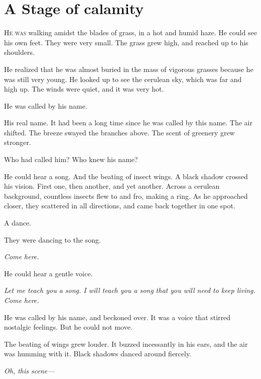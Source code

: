 
\chapter{A Stage of calamity}


\lettrine{H}{e was} walking amidst the blades of grass, in a hot and humid haze. He
could see his own feet. They were very small. The grass grew high, and
reached up to his shoulders.

He realized that he was almost buried in the mass of vigorous grasses
because he was still very young. He looked up to see the cerulean sky,
which was far and high up. The winds were quiet, and it was very hot.

He was called by his name.

His real name. It had been a long time since he was called by this name.
The air shifted. The breeze swayed the branches above. The scent of
greenery grew stronger.

Who had called him? Who knew his name?

He could hear a song. And the beating of insect wings. A black shadow
crossed his vision. First one, then another, and yet another. Across a
cerulean background, countless insects flew to and fro, making a ring.
As he approached closer, they scattered in all directions, and came back
together in one spot.

A dance.

They were dancing to the song.

\emph{Come here.}

He could hear a gentle voice.

\emph{Let me teach you a song. I will teach you a song that you will need to
keep living. Come here.}

He was called by his name, and beckoned over. It was a voice that
stirred nostalgic feelings. But he could not move.

The beating of wings grew louder. It buzzed incessantly in his ears, and
the air was humming with it. Black shadows danced around fiercely.

\emph{Oh, this scene---}


